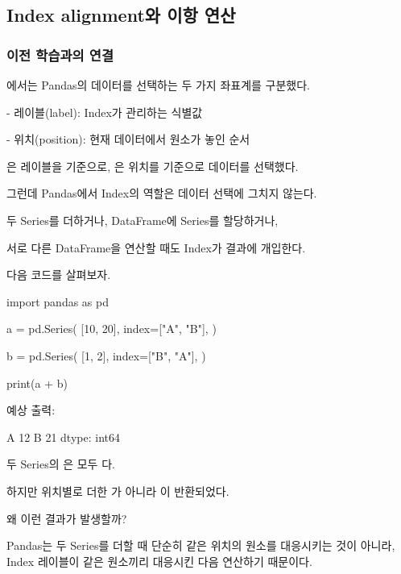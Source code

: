 

\subsection{Index alignment와 이항 연산}

\subsubsection{이전 학습과의 연결}

에서는 Pandas의 데이터를 선택하는 두 가지 좌표계를 구분했다.

\begin{dhksmry}
    - 레이블(label): Index가 관리하는 식별값

    - 위치(position): 현재 데이터에서 원소가 놓인 순서
\end{dhksmry}

은 레이블을 기준으로, 은 위치를 기준으로 데이터를 선택했다.

그런데 Pandas에서 Index의 역할은 데이터 선택에 그치지 않는다.

두 Series를 더하거나, DataFrame에 Series를 할당하거나, 

서로 다른 DataFrame을 연산할 때도 Index가 결과에 개입한다.

다음 코드를 살펴보자.

\begin{dhkcode}
import pandas as pd

a = pd.Series(
    [10, 20],
    index=["A", "B"],
)

b = pd.Series(
    [1, 2],
    index=["B", "A"],
)

print(a + b)
\end{dhkcode}

예상 출력:

\begin{dhkzsh}
A    12
B    21
dtype: int64
\end{dhkzsh}

두 Series의 은 모두 다.

하지만 위치별로 더한 \zsh{[11, 22]}가 아니라 \zsh{[12, 21]}이 반환되었다.

왜 이런 결과가 발생할까?

Pandas는 두 Series를 더할 때 단순히 같은 위치의 원소를 대응시키는 것이 아니라, Index 레이블이 같은 원소끼리 대응시킨 다음 연산하기 때문이다.

